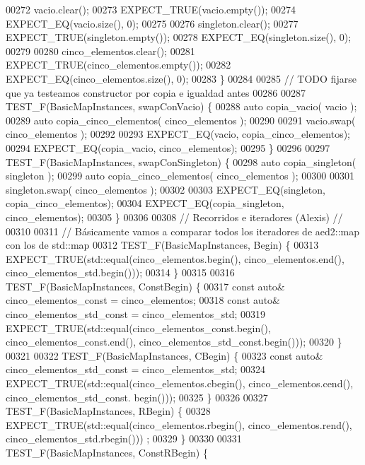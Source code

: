 \begin{DoxyCode}
00272     vacio.clear();
00273     EXPECT\_TRUE(vacio.empty());
00274     EXPECT\_EQ(vacio.size(), 0);
00275 
00276     singleton.clear();
00277     EXPECT\_TRUE(singleton.empty());
00278     EXPECT\_EQ(singleton.size(), 0);
00279 
00280     cinco\_elementos.clear();
00281     EXPECT\_TRUE(cinco\_elementos.empty());
00282     EXPECT\_EQ(cinco\_elementos.size(), 0);
00283 \}
00284 
00285 \textcolor{comment}{// TODO fijarse que ya testeamos constructor por copia e igualdad antes}
00286 
00287 TEST\_F(BasicMapInstances, swapConVacio) \{
00288     \textcolor{keyword}{auto} copia\_vacio( vacio );
00289     \textcolor{keyword}{auto} copia\_cinco\_elementos( cinco\_elementos );
00290 
00291     vacio.swap( cinco\_elementos );
00292 
00293     EXPECT\_EQ(vacio, copia\_cinco\_elementos);
00294     EXPECT\_EQ(copia\_vacio, cinco\_elementos);
00295 \}
00296 
00297 TEST\_F(BasicMapInstances, swapConSingleton) \{
00298     \textcolor{keyword}{auto} copia\_singleton( singleton );
00299     \textcolor{keyword}{auto} copia\_cinco\_elementos( cinco\_elementos );
00300 
00301     singleton.swap( cinco\_elementos );
00302 
00303     EXPECT\_EQ(singleton, copia\_cinco\_elementos);
00304     EXPECT\_EQ(copia\_singleton, cinco\_elementos);
00305 \}
00306 
00308 \textcolor{comment}{// Recorridos e iteradores (Alexis) //}
00310 \textcolor{comment}{}
00311 \textcolor{comment}{// Básicamente vamos a comparar todos los iteradores de aed2::map con los de std::map}
00312 TEST\_F(BasicMapInstances, Begin) \{
00313     EXPECT\_TRUE(std::equal(cinco\_elementos.begin(), cinco\_elementos.end(), cinco\_elementos\_std.begin()));
00314 \}
00315 
00316 TEST\_F(BasicMapInstances, ConstBegin) \{
00317     \textcolor{keyword}{const} \textcolor{keyword}{auto}& cinco\_elementos\_const = cinco\_elementos;
00318     \textcolor{keyword}{const} \textcolor{keyword}{auto}& cinco\_elementos\_std\_const = cinco\_elementos\_std;
00319     EXPECT\_TRUE(std::equal(cinco\_elementos\_const.begin(), cinco\_elementos\_const.end(), 
      cinco\_elementos\_std\_const.begin()));
00320 \}
00321 
00322 TEST\_F(BasicMapInstances, CBegin) \{
00323     \textcolor{keyword}{const} \textcolor{keyword}{auto}& cinco\_elementos\_std\_const = cinco\_elementos\_std;
00324     EXPECT\_TRUE(std::equal(cinco\_elementos.cbegin(), cinco\_elementos.cend(), cinco\_elementos\_std\_const.
      begin()));
00325 \}
00326 
00327 TEST\_F(BasicMapInstances, RBegin) \{
00328     EXPECT\_TRUE(std::equal(cinco\_elementos.rbegin(), cinco\_elementos.rend(), cinco\_elementos\_std.rbegin()))
      ;
00329 \}
00330 
00331 TEST\_F(BasicMapInstances, ConstRBegin) \{

\end{DoxyCode}
